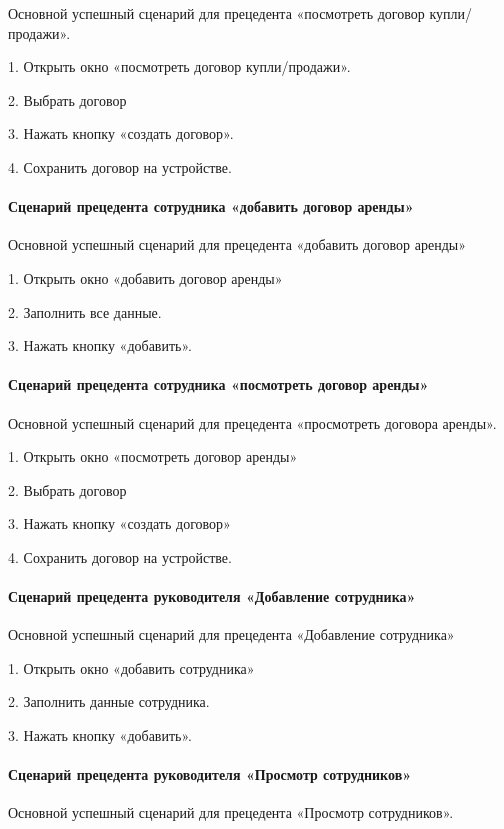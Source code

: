 Основной успешный сценарий для прецедента «посмотреть договор купли/продажи».

1.	Открыть окно «посмотреть договор купли/продажи».

2.	Выбрать договор

3.	Нажать кнопку «создать договор».

4.	Сохранить договор на устройстве.

\paragraph{Сценарий прецедента сотрудника «добавить договор аренды»}

Основной успешный сценарий для прецедента «добавить договор аренды»

1.	Открыть окно «добавить договор аренды»

2.	Заполнить все данные.

3.	Нажать кнопку «добавить».

\paragraph{Сценарий прецедента сотрудника «посмотреть договор аренды»}

Основной успешный сценарий для прецедента «просмотреть договора аренды».

1.	Открыть окно «посмотреть договор аренды»

2.	Выбрать договор

3.	Нажать кнопку «создать договор»

4.	Сохранить договор на устройстве.

\paragraph{Сценарий прецедента руководителя «Добавление сотрудника»}

Основной успешный сценарий для прецедента «Добавление сотрудника» 

1.	Открыть окно «добавить сотрудника»

2.	Заполнить данные сотрудника.

3.	Нажать кнопку «добавить».

\paragraph{Сценарий прецедента руководителя «Просмотр сотрудников»}

Основной успешный сценарий для прецедента «Просмотр сотрудников».

